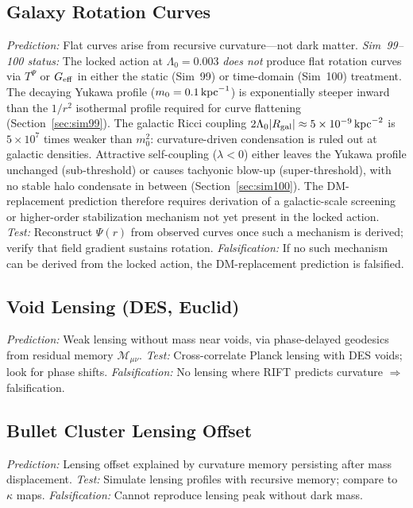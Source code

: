 \documentclass[12pt,a4paper]{article}
\begin{document}
\subsection{Galaxy Rotation Curves}
\emph{Prediction:} Flat curves arise from recursive curvature---not dark matter.
\emph{Sim~99--100 status:} The locked action at $\Lambda_0=0.003$ \emph{does not}
produce flat rotation curves via $T^\Psi$ or $G_{\rm eff}$ in either the static
(Sim~99) or time-domain (Sim~100) treatment.  The decaying Yukawa profile
($m_0 = 0.1\,{\rm kpc}^{-1}$) is exponentially steeper inward than the
$1/r^2$ isothermal profile required for curve flattening
(Section~\ref{sec:sim99}).  The galactic Ricci coupling
$2\Lambda_0|R_{\rm gal}|\approx5\times10^{-9}\,{\rm kpc}^{-2}$ is $5\times10^7$
times weaker than $m_0^2$: curvature-driven condensation is ruled out at
galactic densities.  Attractive self-coupling ($\lambda<0$) either leaves
the Yukawa profile unchanged (sub-threshold) or causes tachyonic blow-up
(super-threshold), with no stable halo condensate in between
(Section~\ref{sec:sim100}).  The DM-replacement prediction therefore
requires derivation of a galactic-scale screening or higher-order stabilization
mechanism not yet present in the locked action.
\emph{Test:} Reconstruct $\Psi(r)$ from observed curves once such a mechanism
is derived; verify that field gradient sustains rotation.
\emph{Falsification:} If no such mechanism can be derived from the locked action,
the DM-replacement prediction is falsified.

\subsection{Void Lensing (DES, Euclid)}
\emph{Prediction:} Weak lensing without mass near voids, via phase-delayed geodesics
from residual memory $\mathcal{M}_{\mu\nu}$.
\emph{Test:} Cross-correlate Planck lensing with DES voids; look for phase shifts.
\emph{Falsification:} No lensing where RIFT predicts curvature $\Rightarrow$ falsification.

\subsection{Bullet Cluster Lensing Offset}
\emph{Prediction:} Lensing offset explained by curvature memory persisting after
mass displacement.
\emph{Test:} Simulate lensing profiles with recursive memory; compare to $\kappa$ maps.
\emph{Falsification:} Cannot reproduce lensing peak without dark mass.
\end{document}
